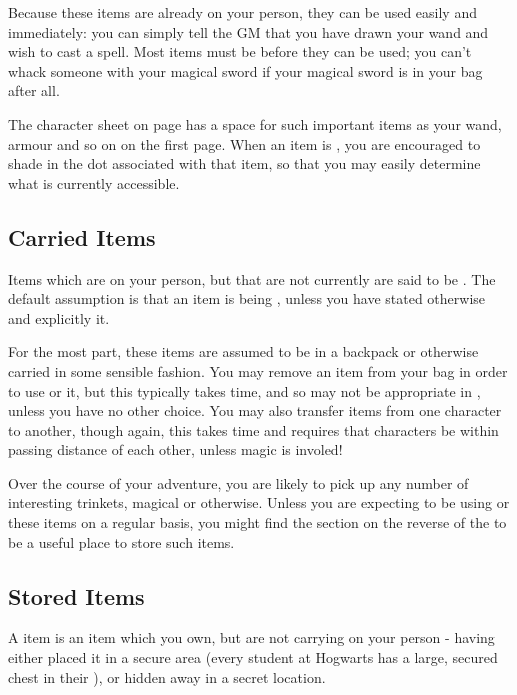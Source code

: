 Because these items are already on your person, they can be used easily and immediately: you can simply tell the GM that you have drawn your wand and wish to cast a spell. Most items must be  before they can be used; you can't whack someone with your magical sword\comma{} if your magical sword is in your bag\comma{} after all. 

The character sheet on page \pageref{S:CharacterSheet} has a space for such important items as your wand, armour and so on on the first page. When an item is , you are encouraged to shade in the dot associated with that item, so that you may easily determine what is currently accessible. 

\subsection{Carried Items}

Items which are on your person, but that are not currently  are said to be . The default assumption is that an item is being , unless you have stated otherwise and explicitly  it. 

For the most part, these items are assumed to be in a backpack or otherwise carried in some sensible fashion. You may remove an item from your bag in order to use or  it, but this typically takes time, and so may not be appropriate in , unless you have no other choice. You may also transfer items from one character to another, though again, this takes time and requires that characters be within passing distance of each other, unless magic is involed!

Over the course of your adventure, you are likely to pick up any number of interesting trinkets, magical or otherwise. Unless you are expecting to be using or  these items on a regular basis, you might find the  section on the reverse of the  to be a useful place to store such items. 


\subsection{Stored Items}

A  item is an item which you own, but are not carrying on your person - having either placed it in a secure area (every student at Hogwarts has a large, secured chest in their ), or hidden away in a secret location. 

